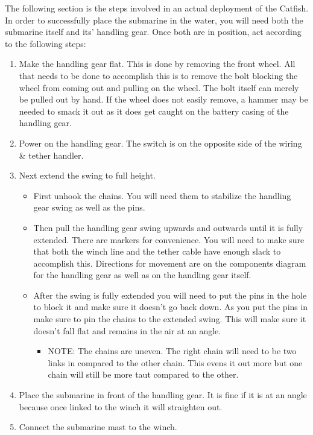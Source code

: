 \documentclass[
18pt, %
a4paper, %
oneside, %
headinclude,footinclude, %
]{scrartcl}
\begin{document}
The following section is the steps involved in an actual deployment of the Catfish. In order to successfully place the submarine in the water, you will need both the submarine itself and its' handling gear. Once both are in position, act according to the following steps:

\begin{enumerate}
	\item Make the handling gear flat. This is done by removing the front wheel. All that needs to be done to accomplish this is to remove the bolt blocking the wheel from coming out and pulling on the wheel. The bolt itself can merely be pulled out by hand. If the wheel does not easily remove, a hammer may be needed to smack it out as it does get caught on the battery casing of the handling gear.
	\item Power on the handling gear. The switch is on the opposite side of the wiring \& tether handler.
	\item Next extend the swing to full height.
	\begin{itemize}
		\item First unhook the chains. You will need them to stabilize the handling gear swing as well as the pins.
		\item Then pull the handling gear swing upwards and outwards until it is fully extended. There are markers for convenience. You will need to make sure that both the winch line and the tether cable have enough slack to accomplish this. Directions for movement are on the components diagram for the handling gear as well as on the handling gear itself.
		\item After the swing is fully extended you will need to put the pins in the hole to block it and make sure it doesn't go back down. As you put the pins in make sure to pin the chains to the extended swing. This will make sure it doesn't fall flat and remains in the air at an angle.
		\begin{itemize}
			\item NOTE: The chains are uneven. The right chain will need to be two links in compared to the other chain. This evens it out more but one chain will still be more taut compared to the other.
		\end{itemize}
	\end{itemize}	
	\item Place the submarine in front of the handling gear. It is fine if it is at an angle because once linked to the winch it will straighten out. 
	\item Connect the submarine mast to the winch.

\end{enumerate}
\end{document}
